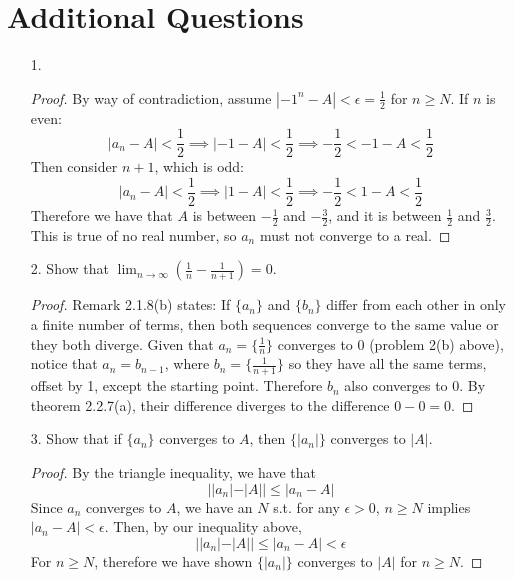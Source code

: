 \documentclass[hidelinks,12pt]{article}
\renewcommand{\geq}{\geqslant}
\renewcommand{\leq}{\leqslant}
\begin{document}
\section*{Additional Questions}
\begin{enumerate}
    \item[1.] \begin{proof}
        By way of contradiction, assume $|-1^n-A|<\epsilon=\frac{1}{2}$ for $n\geq N$. If $n$ is even: $$|a_n-A|<\frac{1}{2}\implies |-1-A|<\frac{1}{2}\implies-\frac{1}{2}<-1-A<\frac{1}{2}$$ Then consider $n+1$, which is odd: $$|a_n-A|<\frac{1}{2}\implies |1-A|<\frac{1}{2}\implies-\frac{1}{2}<1-A<\frac{1}{2}$$ Therefore we have that $A$ is between $-\frac{1}{2}$ and $-\frac{3}{2}$, and it is between $\frac{1}{2}$ and $\frac{3}{2}$. This is true of no real number, so $a_n$ must not converge to a real.
    \end{proof}
    \item[2.] Show that $\lim_{n\to\infty}(\frac{1}{n}-\frac{1}{n+1})=0$.\begin{proof}
    Remark 2.1.8(b) states: If $\{a_n\}$ and $\{b_n\}$ differ from each other in only a finite number of terms, then both sequences converge to the same value or they both diverge. Given that $a_n=\{\frac{1}{n}\}$ converges to 0 (problem 2(b) above), notice that $a_n=b_{n-1}$, where $b_n=\{\frac{1}{n+1}\}$ so they have all the same terms, offset by 1, except the starting point. Therefore $b_n$ also converges to 0. By theorem 2.2.7(a), their difference diverges to the difference $0-0=0$.
    \end{proof}
    \item[3.] Show that if $\{a_n\}$ converges to $A$, then $\{|a_n|\}$ converges to $|A|$.\begin{proof}
        By the triangle inequality, we have that $$||a_n|-|A||\leq|a_n-A|$$ Since $a_n$ converges to $A$, we have an $N$ s.t. for any $\epsilon>0$, $n\geq N$ implies $|a_n-A|<\epsilon$. Then, by our inequality above, $$||a_n|-|A||\leq|a_n-A|<\epsilon$$ For $n\geq N$, therefore we have shown $\{|a_n|\}$ converges to $|A|$ for $n\geq N$.
    \end{proof}
\end{enumerate}
\end{document}
